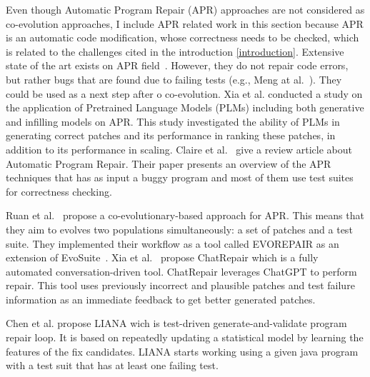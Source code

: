   Even though Automatic Program Repair (APR) approaches are not considered as co-evolution approaches, I include APR related work in this section because APR is an automatic code modification, whose correctness needs to be checked, which is related to the challenges cited in the introduction \ref{introduction}. 
  Extensive state of the art exists on APR field~\cite{goues2019automated,liu2020efficiency,monperrus2018automatic,gazzola2017automatic}. However, they do not repair code errors, but rather bugs that are found due to failing tests (e.g., Meng at al.~\cite{10.5555/2486788.2486855}). 
 They could be used as a next step after o co-evolution. 
Xia et al. \cite{10.1109/ICSE48619.2023.00129} conducted a study on the application of Pretrained Language Models (PLMs) including both generative and infilling models on APR. This study investigated the ability of PLMs in generating correct patches and its performance in ranking these patches, in addition to its performance in scaling.
Claire et al.~\cite{goues2019automated} give a review article about Automatic Program Repair. Their paper presents an overview of the APR techniques that has as input a buggy program and most of them use test suites for correctness checking.
 
Ruan et al.~\cite{10638555} propose a co-evolutionary-based approach for APR. This means that they aim to evolves two populations simultaneously: a set of patches and a test suite. They implemented their workflow as a tool called EVOREPAIR as an extension of EvoSuite~\cite{fraser2011evosuite}.
 Xia et al.~\cite{10.1145/3650212.3680323} propose ChatRepair which is a fully automated conversation-driven tool. ChatRepair leverages ChatGPT to perform repair. This tool uses previously incorrect and plausible patches and test failure information as an immediate feedback to get better generated patches.


 
Chen et al. \cite{9749899} propose LIANA wich is test-driven generate-and-validate program repair loop. It is based on repeatedly updating a statistical model by learning the features of the fix candidates. LIANA starts working using a given java program with a test suit that has at least one failing test. 
 


 
